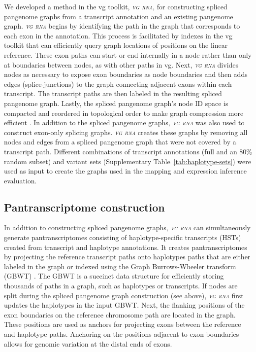 \documentclass[11pt]{ucthesis}
\newcommand{\tool}[1]{\emph{\textsc{#1}}}
\begin{document}
We developed a method in the vg toolkit, \tool{vg rna}, for constructing spliced pangenome graphs from a transcript annotation and an existing pangenome graph. \tool{vg rna} begins by identifying the path in the graph that corresponds to each exon in the annotation. This process is facilitated by indexes in the vg toolkit that can efficiently query graph locations of positions on the linear reference. These exon paths can start or end internally in a node rather than only at boundaries between nodes, as with other paths in vg. Next, \tool{vg rna} divides nodes as necessary to expose exon boundaries as node boundaries and then adds edges (splice-junctions) to the graph connecting adjacent exons within each transcript. The transcript paths are then labeled in the resulting spliced pangenome graph. Lastly, the spliced pangenome graph's node ID space is compacted and reordered in topological order to make graph compression more efficient \cite{eizenga2020efficient}. 
\newline 
\newline
In addition to the spliced pangenome graphs, \tool{vg rna} was also used to construct exon-only splicing graphs. \tool{vg rna} creates these graphs by removing all nodes and edges from a spliced pangenome graph that were not covered by a transcript path. Different combinations of transcript annotations (full and an 80\% random subset) and variant sets (Supplementary Table~\ref{tab:haplotype-sets}) were used as input to create the graphs used in the mapping and expression inference evaluation. 

\subsection{Pantranscriptome construction}

In addition to constructing spliced pangenome graphs, \tool{vg rna} can simultaneously generate pantranscriptomes consisting of haplotype-specific transcripts (HSTs) created from transcript and haplotype annotations. It creates pantranscriptomes by projecting the reference transcript paths onto haplotypes paths that are either labeled in the graph or indexed using the Graph Burrows-Wheeler transform (GBWT) \cite{siren2020haplotype}. The GBWT is a succinct data structure for efficiently storing thousands of paths in a graph, such as haplotypes or transcripts. If nodes are split during the spliced pangenome graph construction (see above), \tool{vg rna} first updates the haplotypes in the input GBWT. Next, the flanking positions of the exon boundaries on the reference chromosome path are located in the graph. These positions are used as anchors for projecting exons between the reference and haplotype paths. Anchoring on the positions adjacent to exon boundaries allows for genomic variation at the distal ends of exons. 
\end{document}
